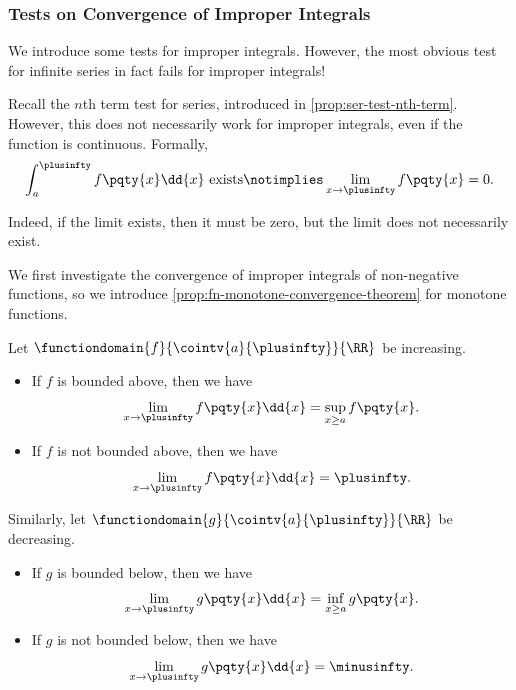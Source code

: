 \subsubsection{Tests on Convergence of Improper Integrals}

We introduce some tests for improper integrals. However, the most obvious test for infinite series in fact fails for improper integrals!

\begin{remark}
    Recall the \(n\)th term test for series, introduced in \autoref{prop:ser-test-nth-term}. However, this does not necessarily work for improper integrals, even if the function is continuous. Formally,
    \[
        \int_{a}^{\plusinfty} f\pqty{x} \dd{x} \text{ exists} \notimplies \lim_{x \to \plusinfty} f\pqty{x} = 0.
    \]

    Indeed, if the limit exists, then it must be zero, but the limit does not necessarily exist.
\end{remark}

We first investigate the convergence of improper integrals of non-negative functions, so we introduce \autoref{prop:fn-monotone-convergence-theorem} for monotone functions.

\begin{proposition}
    \label{prop:fn-monotone-convergence-theorem}%
    Let \(\functiondomain{f}{\cointv{a}{\plusinfty}}{\RR}\) be increasing.

    \begin{itemize}
        \item If \(f\) is bounded above, then we have
        \[
            \lim_{x \to \plusinfty} f\pqty{x} \dd{x} = \sup_{x \geq a} f\pqty{x}.
        \]
        \item If \(f\) is not bounded above, then we have
        \[
            \lim_{x \to \plusinfty} f\pqty{x} \dd{x} = \plusinfty.
        \]
    \end{itemize}

    Similarly, let \(\functiondomain{g}{\cointv{a}{\plusinfty}}{\RR}\) be decreasing.

    \begin{itemize}
        \item If \(g\) is bounded below, then we have
        \[
            \lim_{x \to \plusinfty} g\pqty{x} \dd{x} = \inf_{x \geq a} g\pqty{x}.
        \]
        \item If \(g\) is not bounded below, then we have
        \[
            \lim_{x \to \plusinfty} g\pqty{x} \dd{x} = \minusinfty.
        \]
    \end{itemize}
\end{proposition}

